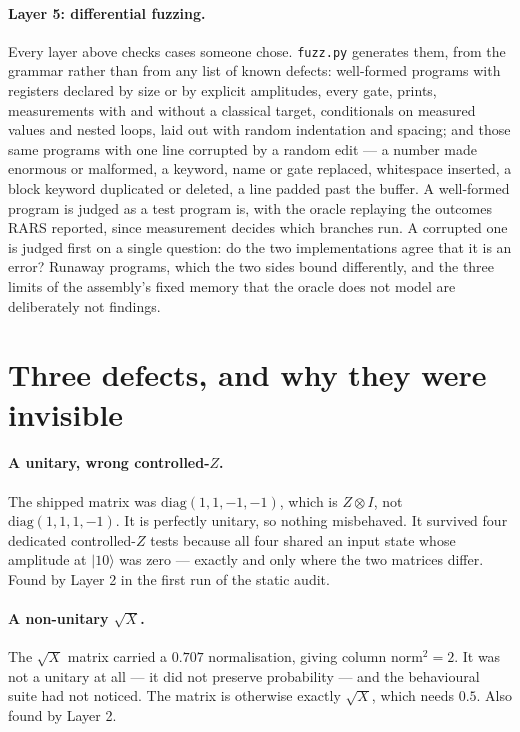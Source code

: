 \documentclass[11pt]{article}
\newcommand{\ket}[1]{\ensuremath{|#1\rangle}}
\begin{document}
\paragraph{Layer 5: differential fuzzing.} Every layer above checks cases someone chose.
\texttt{fuzz.py} generates them, from the grammar rather than from any list of known
defects: well-formed programs with registers declared by size or by explicit amplitudes,
every gate, prints, measurements with and without a classical target, conditionals on
measured values and nested loops, laid out with random indentation and spacing; and those
same programs with one line corrupted by a random edit --- a number made enormous or
malformed, a keyword, name or gate replaced, whitespace inserted, a block keyword
duplicated or deleted, a line padded past the buffer. A well-formed program is judged as a
test program is, with the oracle replaying the outcomes RARS reported, since measurement
decides which branches run. A corrupted one is judged first on a single question: do the
two implementations agree that it is an error? Runaway programs, which the two sides bound
differently, and the three limits of the assembly's fixed memory that the oracle does not
model are deliberately not findings.

\section{Three defects, and why they were invisible}
\label{sec:defects}

\paragraph{A unitary, wrong controlled-$Z$.} The shipped matrix was
$\mathrm{diag}(1,1,-1,-1)$, which is $Z \otimes I$, not $\mathrm{diag}(1,1,1,-1)$. It is
perfectly unitary, so nothing misbehaved. It survived four dedicated controlled-$Z$ tests
because all four shared an input state whose amplitude at \ket{10} was zero --- exactly and
only where the two matrices differ. Found by Layer 2 in the first run of the static audit.

\paragraph{A non-unitary $\sqrt{X}$.} The $\sqrt{X}$ matrix carried a $0.707$ normalisation,
giving column norm$^2 = 2$. It was not a unitary at all --- it did not preserve probability
--- and the behavioural suite had not noticed. The matrix is otherwise exactly $\sqrt{X}$,
which needs $0.5$. Also found by Layer 2.
\end{document}
